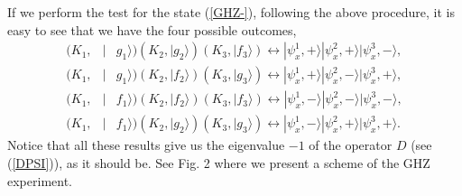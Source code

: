\documentclass[12pt,thmsa]{article}
\begin{document}
If we perform the test for the state (\ref{GHZ-}), following the above
procedure, it is easy to see that we have the four possible outcomes,%
\begin{eqnarray}
(K_{1}, &\mid &g_{1}\rangle )(K_{2},\mid g_{2}\rangle )(K_{3},\mid
f_{3}\rangle )\longleftrightarrow |\psi _{x}^{1},+\rangle |\psi
_{x}^{2},+\rangle |\psi _{x}^{3},-\rangle ,  \nonumber \\
(K_{1}, &\mid &g_{1}\rangle )(K_{2},\mid f_{2}\rangle )(K_{3},\mid
g_{3}\rangle )\longleftrightarrow |\psi _{x}^{1},+\rangle |\psi
_{x}^{2},-\rangle |\psi _{x}^{3},+\rangle ,  \nonumber \\
(K_{1}, &\mid &f_{1}\rangle )(K_{2},\mid f_{2}\rangle )(K_{3},\mid
f_{3}\rangle )\longleftrightarrow |\psi _{x}^{1},-\rangle |\psi
_{x}^{2},-\rangle |\psi _{x}^{3},-\rangle ,  \nonumber \\
(K_{1}, &\mid &f_{1}\rangle )(K_{2},\mid g_{2}\rangle )(K_{3},\mid
g_{3}\rangle )\longleftrightarrow |\psi _{x}^{1},-\rangle |\psi
_{x}^{2},+\rangle |\psi _{x}^{3},+\rangle .  \label{GHZT-}
\end{eqnarray}%
Notice that all these results give us the eigenvalue $-1$ of the operator $D$
(see (\ref{DPSI})), as it should be. See Fig. 2 where we present a scheme of
the GHZ experiment.
\end{document}
